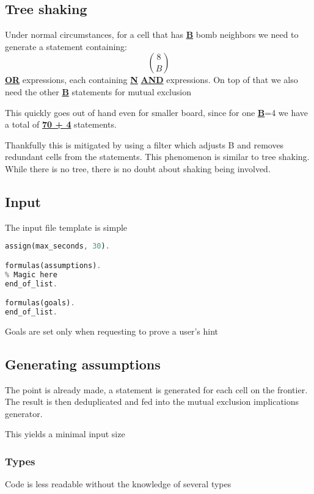 \documentclass{article}
\begin{document}
    \subsection{Tree shaking}
    Under normal circumstances, for a cell that has \underline{\textbf{B}} bomb neighbors we need to generate a statement containing:
    \[
        {8}\choose{B}
    \]
    \underline{\textbf{OR}} expressions, each containing \underline{\textbf{N}} \underline{\textbf{AND}} expressions. On top of that we also need the other \underline{\textbf{B}} statements for mutual exclusion
    
    This quickly goes out of hand even for smaller board, since for one \underline{\textbf{B}}=4 we have a total of \underline{\textbf{70 + 4}} statements.
    
    Thankfully this is mitigated by using a filter which adjusts B and removes redundant cells from the statements. This phenomenon is similar to tree shaking. While there is no tree, there is no doubt about shaking being involved.
    
    \subsection{Input}
    The input file template is simple
    
    \begin{lstlisting}[language=rust]	
assign(max_seconds, 30).

formulas(assumptions).
% Magic here
end_of_list.

formulas(goals).
end_of_list.
    \end{lstlisting}
    
    Goals are set only when requesting to prove a user's hint
    
    \subsection{Generating assumptions}
        The point is already made, a statement is generated for each cell on the frontier. The result is then deduplicated and fed into the mutual exclusion implications generator.
    
        This yields a minimal input size

        \subsubsection{Types}
            Code is less readable without the knowledge of several types
\end{document}
